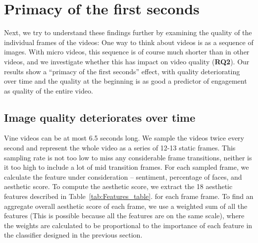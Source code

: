 \section{Primacy of the first seconds}

Next, we try to understand these findings further by examining the quality of the individual frames of the videos: One way to think about videos is as a sequence of images. With micro videos, this sequence is of course much shorter than in other videos, and we investigate whether this has impact on video quality (\textbf{RQ2}). Our results show a ``primacy of the first seconds'' effect, with quality deteriorating over time and the quality at the beginning is as good a predictor of engagement as quality of the entire video.

\subsection{Image quality deteriorates over time}




Vine videos can be at most 6.5 seconds long. We sample the videos twice every second and represent the whole video as a series of 12-13 static frames. This sampling rate is not too low to miss any considerable frame transitions, neither is it too high to include a lot of mid transition frames. For each sampled frame, we calculate the feature under consideration -- sentiment, percentage of faces, and aesthetic score. To compute the aesthetic score, we extract the 18 aesthetic features described in Table~\ref{tab:Features_table}. for each frame frame. To find an aggregate overall aesthetic score of each frame, we use a weighted sum of all the features (This is possible because all the features are on the same scale), where the weights are calculated to be proportional to the importance of each feature in the classifier designed in the previous section. 


